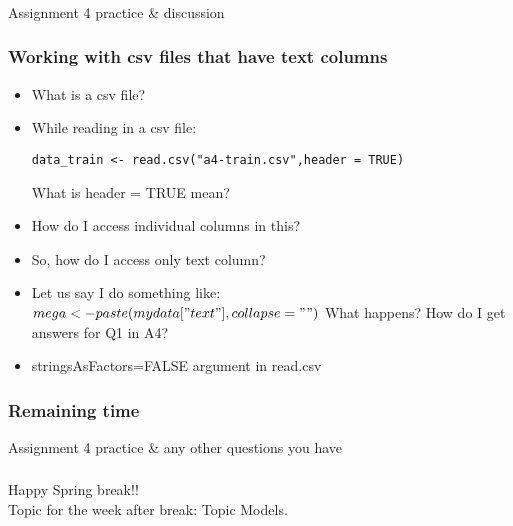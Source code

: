 \documentclass{beamer}
\begin{document}
\begin{frame}
\frametitle{}
\Large Assignment 4 practice \& discussion
\end{frame}

\begin{frame}[fragile]
\frametitle{Working with csv files that have text columns}
\begin{itemize}
\item What is a csv file? 
\item While reading in a csv file:
\begin{verbatim}
data_train <- read.csv("a4-train.csv",header = TRUE)
\end{verbatim}
What is header = TRUE mean? \pause
\item How do I access individual columns in this? \pause
\item So, how do I access only text column? \pause
\item Let us say I do something like: \\ 
$mega <- paste(mydata["text"], collapse=" ")$
What happens? How do I get answers for Q1 in A4? \pause
\item stringsAsFactors=FALSE argument in read.csv
\end{itemize}
\end{frame}

\begin{frame}
\frametitle{Remaining time}
\Large Assignment 4 practice \& any other questions you have
\end{frame}

\begin{frame}
\frametitle{}
\Large Happy Spring break!!
\\ \small Topic for the week after break: Topic Models.
\end{frame}
\end{document}
